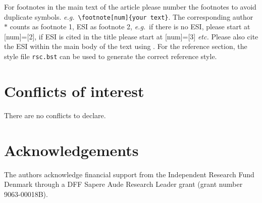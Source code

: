 \documentclass[twoside,twocolumn,9pt]{article}
\renewcommand{\refname}{Notes and references}
\begin{document}
For footnotes in the main text of the article please number the footnotes to avoid duplicate symbols. \textit{e.g.}\ \texttt{\textbackslash footnote[num]\{your text\}}. The corresponding author $\ast$ counts as footnote 1, ESI as footnote 2, \textit{e.g.}\ if there is no ESI, please start at [num]=[2], if ESI is cited in the title please start at [num]=[3] \textit{etc.} Please also cite the ESI within the main body of the text using \dag. For the reference section, the style file \texttt{rsc.bst} can be used to generate the correct reference style.

\section*{Conflicts of interest}
There are no conflicts to declare.

\section*{Acknowledgements}
The authors acknowledge financial support from the Independent Research Fund Denmark through a DFF Sapere Aude Research Leader grant (grant number 9063-00018B).





\balance


\end{document}
